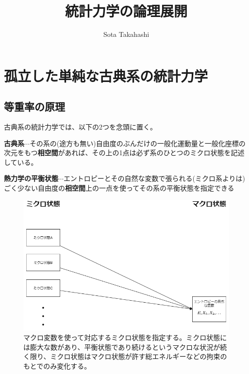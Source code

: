 \documentclass[
]{ltjsbook}
\title{統計力学の論理展開}
\author{Sota Takahashi}
\date{}
\begin{document}
\maketitle

{
\setcounter{tocdepth}{2}
\tableofcontents
}
\newpage

\hypertarget{ux5b64ux7acbux3057ux305fux5358ux7d14ux306aux53e4ux5178ux7cfbux306eux7d71ux8a08ux529bux5b66}{%
\section{孤立した単純な古典系の統計力学}\label{ux5b64ux7acbux3057ux305fux5358ux7d14ux306aux53e4ux5178ux7cfbux306eux7d71ux8a08ux529bux5b66}}

\hypertarget{ux7b49ux91cdux7387ux306eux539fux7406}{%
\subsection{等重率の原理}\label{ux7b49ux91cdux7387ux306eux539fux7406}}

古典系の統計力学では、以下の2つを念頭に置く。

\textbf{古典系}\(\cdots\)その系の(途方も無い)自由度のぶんだけの一般化運動量と一般化座標の次元をもつ\textbf{相空間}があれば、その上の1点は必ず系のひとつのミクロ状態を記述している。

\textbf{熱力学の平衡状態}\(\cdots\)エントロピーとその自然な変数で張られる(ミクロ系よりは)ごく少ない自由度の\textbf{相空間}上の一点を使ってその系の平衡状態を指定できる

\begin{figure}
\hypertarget{fig:micro_macro}{%
\centering
\includegraphics{images/micro_macro.drawio.png}
\caption{マクロ変数を使って対応するミクロ状態を指定する。ミクロ状態には膨大な数があり、平衡状態であり続けるというマクロな状況が続く限り、ミクロ状態はマクロ状態が許す総エネルギーなどの拘束のもとでのみ変化する。}\label{fig:micro_macro}
}
\end{figure}
\end{document}
